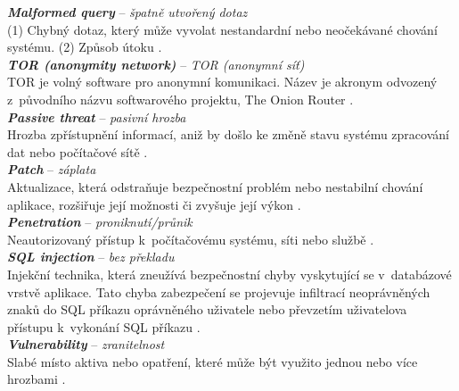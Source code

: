 \textit{\textbf{Malformed query}} -- \textit{špatně utvořený dotaz} \label{app:a:malformedquery} \\ %
(1) Chybný dotaz, který může vyvolat nestandardní nebo neočekávané chování systému.
(2) Způsob útoku \cite[str. 115]{Slovnik2015}. \\

\textit{\textbf{TOR (anonymity network)}} -- \textit{TOR (anonymní síť)} \label{app:a:tor} \\ %
TOR je volný software pro anonymní komunikaci. Název je akronym odvozený z~původního názvu softwarového projektu, The Onion Router \cite[str. 118]{Slovnik2015}. \\ 

\textit{\textbf{Passive threat}} -- \textit{pasivní hrozba} \label{app:a:passivethreat} \\ %
Hrozba zpřístupnění informací, aniž by došlo ke změně stavu systému zpracování dat nebo počítačové sítě \cite[str. 82]{Slovnik2015}. \\ 

\textit{\textbf{Patch}} -- \textit{záplata} \label{app:a:patch} \\ %
Aktualizace, která odstraňuje bezpečnostní problém nebo nestabilní chování aplikace, \mbox{rozšiřuje} její možnosti či zvyšuje její výkon \cite[str. 133]{Slovnik2015}. \\

\textit{\textbf{Penetration}} -- \textit{proniknutí/průnik} \label{app:a:penetration} \\ %
Neautorizovaný přístup k~počítačovému systému, síti nebo službě \cite[str. 92]{Slovnik2015}. \\

\textit{\textbf{SQL injection}} -- \textit{bez překladu} \label{app:a:sqlinjection} \\
Injekční technika, která zneužívá bezpečnostní chyby vyskytující se v~databázové vrstvě aplikace.
Tato chyba zabezpečení se projevuje infiltrací neoprávněných znaků do SQL příkazu oprávněného uživatele nebo převzetím uživatelova přístupu k~vykonání SQL příkazu \cite[str. 111]{Slovnik2015}. \\

\textit{\textbf{Vulnerability}} -- \textit{zranitelnost} \label{app:a:vulnerability} \\ %
Slabé místo aktiva nebo opatření, které může být využito jednou nebo více hrozbami \cite[str. 136]{Slovnik2015}. \\

